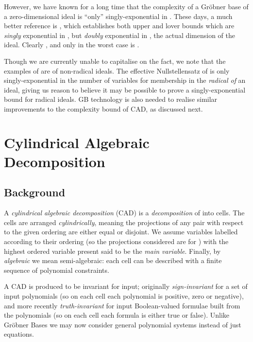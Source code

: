 \documentclass{llncs}
\begin{document}
However, we have known for a long time that the complexity of a Gr\"obner base of a zero-dimensional ideal is ``only'' singly-exponential in  \cite{Lazard1983}.
These days, a much better reference is \cite{MR13}, which establishes both upper and lover bounds which are \emph{singly} exponential in , but \emph{doubly} exponential in , the actual dimension of the ideal. Clearly , and only in the worst case is .

Though we are currently unable to capitalise on the fact, we note that the examples of  \cite{MM82,MR13} are of non-radical ideals. The effective Nullstellensatz of \cite{Kollar1988} is only singly-exponential in the number of variables for membership in the \emph{radical of} an ideal, giving us reason to believe it may be possible to prove a singly-exponential bound for radical ideals.  GB technology is also needed to realise similar improvements to the complexity bound of CAD, as discussed next.



\section{Cylindrical Algebraic Decomposition}
\label{SEC-CAD}


\subsection{Background}

A \emph{cylindrical algebraic decomposition} (CAD) is a \emph{decomposition} of    into cells.  The cells are arranged \emph{cylindrically}, meaning the projections of any pair with respect to the given ordering are either equal or disjoint.  We assume variables labelled according to their ordering (so the projections considered are  for ) with the highest ordered variable present said to be the \emph{main variable}.  Finally, by \emph{algebraic} we mean semi-algebraic: each cell can be described with a finite sequence of polynomial constraints.  

A CAD is produced to be invariant for input; originally \emph{sign-invariant} for a set of input polynomials (so on each cell each polynomial is positive, zero or negative), and more recently \emph{truth-invariant} for input Boolean-valued  formulae built from the polynomials (so on each cell each formula is either true or false).  Unlike Gr\"{o}bner Bases we may now consider general polynomial systems instead of just equations.
\end{document}
